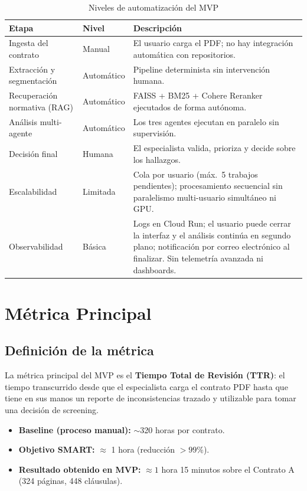 \begin{table}[H]
\centering
\caption{Niveles de automatización del MVP}
\label{tab:automatizacion}
\begin{tabular}{p{4.5cm} p{2.2cm} p{7cm}}
\toprule
\textbf{Etapa} & \textbf{Nivel} & \textbf{Descripción} \\
\midrule
Ingesta del contrato & Manual &
  El usuario carga el PDF; no hay integración automática con repositorios. \\[3pt]
Extracción y segmentación & Automático &
  Pipeline determinista sin intervención humana. \\[3pt]
Recuperación normativa (RAG) & Automático &
  FAISS + BM25 + Cohere Reranker ejecutados de forma autónoma. \\[3pt]
Análisis multi-agente & Automático &
  Los tres agentes ejecutan en paralelo sin supervisión. \\[3pt]
Decisión final & Humana &
  El especialista valida, prioriza y decide sobre los hallazgos. \\[3pt]
Escalabilidad & Limitada &
  Cola por usuario (máx.\ 5 trabajos pendientes); procesamiento secuencial
  sin paralelismo multi-usuario simultáneo ni GPU. \\[3pt]
Observabilidad & Básica &
  Logs en Cloud Run; el usuario puede cerrar la interfaz y el análisis
  continúa en segundo plano; notificación por correo electrónico al
  finalizar. Sin telemetría avanzada ni dashboards. \\
\bottomrule
\end{tabular}
\end{table}

\section{Métrica Principal}

\subsection{Definición de la métrica}

La métrica principal del MVP es el \textbf{Tiempo Total de Revisión (TTR)}:
el tiempo transcurrido desde que el especialista carga el contrato PDF
hasta que tiene en sus manos un reporte de inconsistencias trazado y
utilizable para tomar una decisión de screening.

\begin{itemize}
    \item \textbf{Baseline (proceso manual):} $\sim$320 horas por contrato.
    \item \textbf{Objetivo SMART:} $\approx$ 1 hora (reducción $> 99\%$).
    \item \textbf{Resultado obtenido en MVP:} $\approx 1$ hora 15 minutos
    sobre el Contrato A (324 páginas, 448 cláusulas).
\end{itemize}

